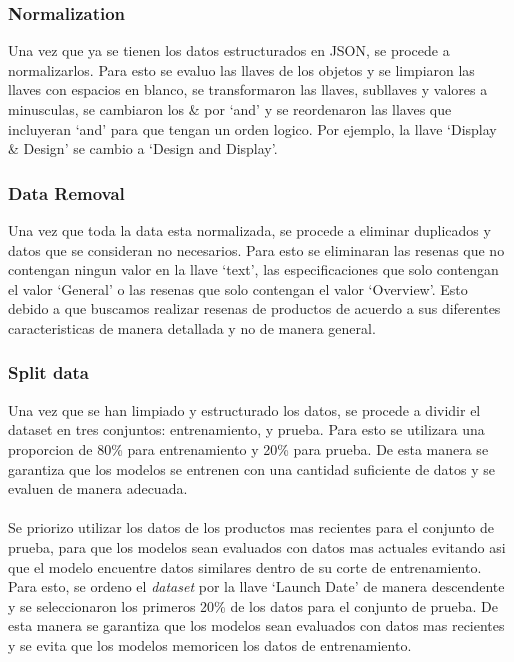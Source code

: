 \subsubsection{Normalization} 
Una vez que ya se tienen los datos estructurados en JSON, se procede a normalizarlos. Para esto se evaluo las llaves de los objetos y se limpiaron las llaves con espacios en blanco, se transformaron las llaves, subllaves y valores a minusculas, se cambiaron los \& por `and' y se reordenaron las llaves que incluyeran `and' para que tengan un orden logico. Por ejemplo, la llave `Display \& Design' se cambio a `Design and Display'.

\subsubsection{Data Removal} 
Una vez que toda la data esta normalizada, se procede a eliminar duplicados y datos que se consideran no necesarios. Para esto se eliminaran las resenas que no contengan ningun valor en la llave `text', las especificaciones que solo contengan el valor `General' o las resenas que solo contengan el valor `Overview'. Esto debido a que buscamos realizar resenas de productos de acuerdo a sus diferentes caracteristicas de manera detallada y no de manera general.

\subsubsection{Split data}
Una vez que se han limpiado y estructurado los datos, se procede a dividir el dataset en tres conjuntos: entrenamiento, y prueba. Para esto se utilizara una proporcion de 80\% para entrenamiento y 20\% para prueba. De esta manera se garantiza que los modelos se entrenen con una cantidad suficiente de datos y se evaluen de manera adecuada. 
\\\\
Se priorizo utilizar los datos de los productos mas recientes para el conjunto de prueba, para que los modelos sean evaluados con datos mas actuales evitando asi que el modelo encuentre datos similares dentro de su corte de entrenamiento. Para esto, se ordeno el \textit{dataset} por la llave `Launch Date' de manera descendente y se seleccionaron los primeros 20\% de los datos para el conjunto de prueba. De esta manera se garantiza que los modelos sean evaluados con datos mas recientes y se evita que los modelos memoricen los datos de entrenamiento.

